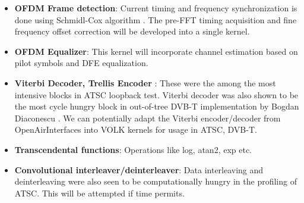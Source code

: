 \documentclass[a4paper,12pt,oneside]{article}
\begin{document}
\begin{itemize}
\item \textbf{OFDM Frame detection}: Current timing and frequency synchronization is done using Schmidl-Cox algorithm \cite{schmidl-cox}. The pre-FFT timing acquisition and fine frequency offset correction will be developed into a single kernel.
\item \textbf{OFDM Equalizer}: This kernel will incorporate channel estimation based on pilot symbols and DFE equalization.
\item \textbf{Viterbi Decoder, Trellis Encoder} : These were the among the most intensive blocks in ATSC loopback test. Viterbi decoder was also shown to be the most cycle hungry block in out-of-tree DVB-T implementation by Bogdan Diaconescu \cite{dvbt}. We can potentially adapt the Viterbi encoder/decoder from OpenAirInterfaces into VOLK kernels for usage in ATSC, DVB-T.
\item \textbf{Transcendental functions}: Operations like log, atan2, exp etc.
\item \textbf{Convolutional interleaver/deinterleaver}: Data interleaving and deinterleaving were also seen to be computationally hungry in the profiling of ATSC. This will be attempted if time permits. 
\end{itemize}
\end{document}

